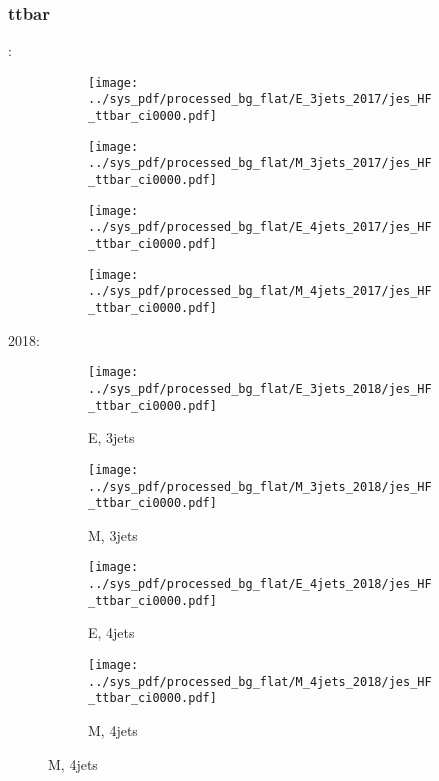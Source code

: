 \documentclass{beamer}
\begin{document}
\begin{frame}
\frametitle{ttbar}
\fontsize{5}{1}:
\begin{figure}
\centering
\begin{subfigure}[b]{0.24\textwidth}
\texttt{[image: ../sys\_pdf/processed\_bg\_flat/E\_3jets\_2017/jes\_HF\_ttbar\_ci0000.pdf]}
\end{subfigure}
\begin{subfigure}[b]{0.24\textwidth}
\texttt{[image: ../sys\_pdf/processed\_bg\_flat/M\_3jets\_2017/jes\_HF\_ttbar\_ci0000.pdf]}
\end{subfigure}
\begin{subfigure}[b]{0.24\textwidth}
\texttt{[image: ../sys\_pdf/processed\_bg\_flat/E\_4jets\_2017/jes\_HF\_ttbar\_ci0000.pdf]}
\end{subfigure}
\begin{subfigure}[b]{0.24\textwidth}
\texttt{[image: ../sys\_pdf/processed\_bg\_flat/M\_4jets\_2017/jes\_HF\_ttbar\_ci0000.pdf]}
\end{subfigure}
\end{figure}
2018:
\begin{figure}
\centering
\begin{subfigure}[b]{0.24\textwidth}
\texttt{[image: ../sys\_pdf/processed\_bg\_flat/E\_3jets\_2018/jes\_HF\_ttbar\_ci0000.pdf]}
\captionsetup{font=tiny}
\caption{E, 3jets}
\end{subfigure}
\begin{subfigure}[b]{0.24\textwidth}
\texttt{[image: ../sys\_pdf/processed\_bg\_flat/M\_3jets\_2018/jes\_HF\_ttbar\_ci0000.pdf]}
\captionsetup{font=tiny}
\caption{M, 3jets}
\end{subfigure}
\begin{subfigure}[b]{0.24\textwidth}
\texttt{[image: ../sys\_pdf/processed\_bg\_flat/E\_4jets\_2018/jes\_HF\_ttbar\_ci0000.pdf]}
\captionsetup{font=tiny}
\caption{E, 4jets}
\end{subfigure}
\begin{subfigure}[b]{0.24\textwidth}
\texttt{[image: ../sys\_pdf/processed\_bg\_flat/M\_4jets\_2018/jes\_HF\_ttbar\_ci0000.pdf]}
\captionsetup{font=tiny}
\caption{M, 4jets}
\end{subfigure}
\end{figure}
\end{frame}
\end{document}
